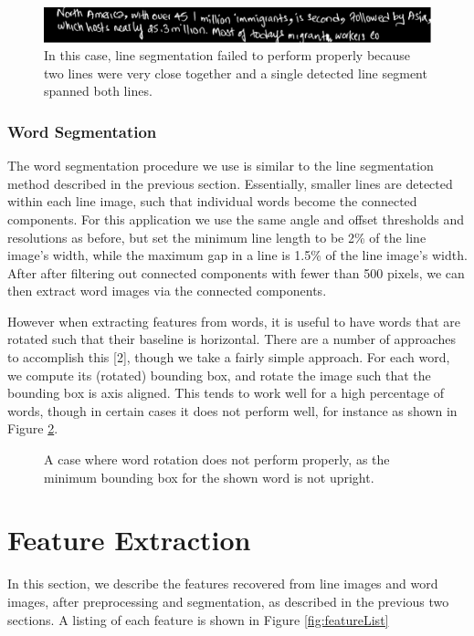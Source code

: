 \documentclass[paper=a4, fontsize=11pt]{scrartcl} %
\numberwithin{equation}{section} %
\numberwithin{figure}{section} %
\numberwithin{table}{section} %
\begin{document}
\begin{figure}
\includegraphics{linefail.png}
\caption{In this case, line segmentation failed to perform properly because two lines were very close together and a single detected line segment spanned both lines.}
\label{fig:linefail}
\end{figure}

\subsubsection{Word Segmentation}
The word segmentation procedure we use is similar to the line
segmentation method described in the previous section. Essentially,
smaller lines are detected within each line image, such that
individual words become the connected components. For this application
we use the same angle and offset thresholds and resolutions as before,
but set the minimum line length to be 2\% of the line image’s width,
while the maximum gap in a line is 1.5\% of the line image’s
width. After after filtering out connected components with fewer than
500 pixels, we can then extract word images via the connected
components.

However when extracting features from words, it is useful to have
words that are rotated such that their baseline is horizontal. There
are a number of approaches to accomplish this [2], though we take a
fairly simple approach. For each word, we compute its (rotated)
bounding box, and rotate the image such that the bounding box is axis
aligned. This tends to work well for a high percentage of words,
though in certain cases it does not perform well, for instance as
shown in Figure \ref{fig:failwordsegment}.
\begin{figure}
  \label{fig:failwordsegment}
  \caption{A case where word rotation does not perform properly, as
    the minimum bounding box for the shown word is not upright.}
\end{figure}


\section{Feature Extraction}
\label{sec:feature}
In this section, we describe the features recovered from line images
and word images, after preprocessing and segmentation, as described in
the previous two sections. A listing of each feature is shown in Figure \ref{fig:featureList}
\end{document}
